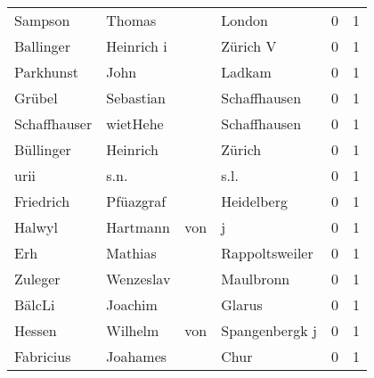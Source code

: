 \begin{center}
\begin{tiny}
\begin{longtabu}{llllrr}
                  Sampson &                             Thomas &             &                                      London &          0 &         1 \\
                Ballinger &                         Heinrich i &             &                                    Zürich V &          0 &         1 \\
                Parkhunst &                               John &             &                                      Ladkam &          0 &         1 \\
                   Grübel &                          Sebastian &             &                                Schaffhausen &          0 &         1 \\
             Schaffhauser &                           wietHehe &             &                                Schaffhausen &          0 &         1 \\
                Büllinger &                           Heinrich &             &                                      Zürich &          0 &         1 \\
                     urii &                               s.n. &             &                                        s.l. &          0 &         1 \\
                Friedrich &                          Pfüazgraf &             &                                  Heidelberg &          0 &         1 \\
                   Halwyl &                           Hartmann &         von &                                           j &          0 &         1 \\
                      Erh &                            Mathias &             &                              Rappoltsweiler &          0 &         1 \\
                  Zuleger &                          Wenzeslav &             &                                   Maulbronn &          0 &         1 \\
                   BälcLi &                            Joachim &             &                                      Glarus &          0 &         1 \\
                   Hessen &                            Wilhelm &         von &                              Spangenbergk j &          0 &         1 \\
                Fabricius &                           Joahames &             &                                        Chur &          0 &         1 \\

\end{longtabu}
\end{tiny}
\end{center}
